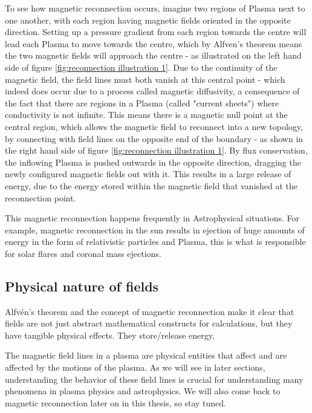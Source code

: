 To see how magnetic reconnection occurs, imagine two regions of Plasma next to one another, with each region having magnetic fields oriented in the opposite direction. Setting up a pressure gradient from each region towards the centre will lead each Plasma to move towards the centre, which by Alfven's theorem means the two magnetic fields will approach the centre - as illustrated on the left hand side of figure \ref{fig:reconnection illustration 1}. Due to the continuity of the magnetic field, the field lines must both vanish at this central point - which indeed does occur due to a process called magnetic diffusivity, a consequence of the fact that there are regions in a Plasma (called "current sheets") where conductivity is not infinite. This means there is a magnetic null point at the central region, which allows the magnetic field to reconnect into a new topology, by connecting with field lines on the opposite end of the boundary - as shown in the right hand side of figure \ref{fig:reconnection illustration 1}. By flux conservation, the inflowing Plasma is pushed outwards in the opposite direction, dragging the newly configured magnetic fields out with it. This results in a large release of energy, due to the energy stored within the magnetic field that vanished at the reconnection point.

This magnetic reconnection happens frequently in Astrophysical situations. For example, magnetic reconnection in the sun results in ejection of huge amounts of energy in the form of relativistic particles and Plasma, this is what is responsible for solar flares and coronal mass ejections.

\subsection{Physical nature of fields}

Alfvén's theorem and the concept of magnetic reconnection make it clear that fields are not just abstract mathematical constructs for calculations, but they have tangible physical effects. They store/release energy, %

The magnetic field lines in a plasma are physical entities that affect and are affected by the motions of the plasma. As we will see in later sections, understanding the behavior of these field lines is crucial for understanding many phenomena in plasma physics and astrophysics. We will also come back to magnetic reconnection later on in this thesis, so stay tuned.


